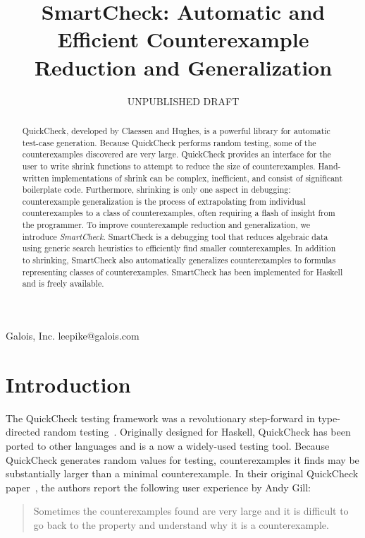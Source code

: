 \documentclass{sigplanconf}
\begin{document}


\title{SmartCheck: Automatic and Efficient Counterexample Reduction and Generalization}
\subtitle{UNPUBLISHED DRAFT}

           {Galois, Inc.}
           {leepike@galois.com}
\maketitle

\begin{abstract}
QuickCheck, developed by Claessen and Hughes, is a powerful library for
automatic test-case generation.  Because QuickCheck performs random testing,
some of the counterexamples discovered are very large.  QuickCheck provides an
interface for the user to write shrink functions to attempt to reduce the size
of counterexamples.  Hand-written implementations of shrink can be complex,
inefficient, and consist of significant boilerplate code.  Furthermore,
shrinking is only one aspect in debugging: counterexample generalization is the
process of extrapolating from individual counterexamples to a class of
counterexamples, often requiring a flash of insight from the programmer.  To
improve counterexample reduction and generalization, we introduce
\emph{SmartCheck}.  SmartCheck is a debugging tool that reduces algebraic data
using generic search heuristics to efficiently find smaller counterexamples.  In
addition to shrinking, SmartCheck also automatically generalizes counterexamples
to formulas representing classes of counterexamples.  SmartCheck has been implemented for Haskell and is freely available.
\end{abstract}




\section{Introduction}\label{sec:intro}
The QuickCheck testing framework was a revolutionary step-forward in
type-directed random testing~\cite{qc,monadic}.  Originally designed for Haskell,
QuickCheck has been ported to other languages and is a now a widely-used testing
tool.  Because QuickCheck generates random values for testing, counterexamples
it finds may be substantially larger than a minimal counterexample.  In their
original QuickCheck paper~\cite{qc}, the authors report the following user
experience by Andy Gill:
%
\begin{quote}
Sometimes the counterexamples found are very large and it is difficult to go
back to the property and understand why it is a counterexample.
\end{quote}
\end{document}
